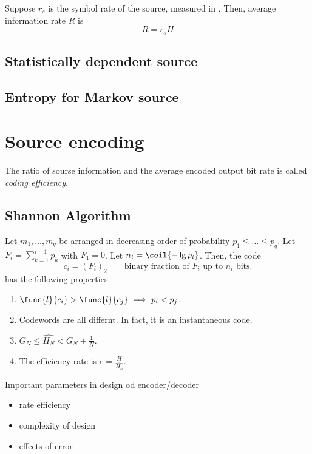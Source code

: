 Suppose \(r_s\) is the symbol rate of the source, measured in \(\). Then, average information rate \(R\) is 
\begin{equation*}
    R = r_sH 
\end{equation*}

\subsection{Statistically dependent source}
\subsection{Entropy for Markov source}

\section{Source encoding}
\begin{definition}
    The ratio of sourse information and the average encoded output bit rate is called \textit{coding efficiency}.
\end{definition}
\subsection{Shannon Algorithm}
Let \(m_1,\dots,m_q\) be arranged in decreasing order of probability \(p_1 \leq \dots \leq p_q\). Let \(F_i = \sum_{k = 1}^{i - 1} p_k\) with \(F_1 = 0\). Let \(n_i = \ceil{-\lg p_i}\). Then, the code 
\begin{equation*}
    c_i = (F_i)_2 \qquad \text{binary fraction of \(F_i\) up to \(n_i\) bits.}
\end{equation*}
has the following properties 
\begin{enumerate}
    \item \(\func{l}{c_i} > \func{l}{c_j} \implies p_i < p_j\).
    \item Codewords are all differnt. In fact, it is an instantaneous code.
    \item \(G_N \leq \hat{H_N} < G_N + \frac{1}{N}\).
    \item The efficiency rate is \(e = \frac{H}{\hat{H_n}}\).
\end{enumerate}
Important parameters in design od encoder/decoder 
\begin{itemize}
    \item rate efficiency
    \item complexity of design
    \item effects of error
\end{itemize}
